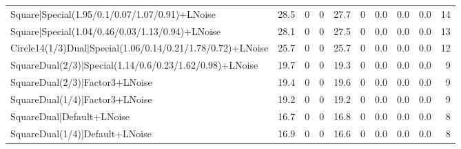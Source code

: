 \begin{tabular}{lrrrrrlllr}
 Square|Special(1.95/0.1/0.07/1.07/0.91)+LNoise                  &            28.5 &             0   &             0   &            27.7 &            0   & 0.0             & 0.0            & 0.0            &           14 \\
 Square|Special(1.04/0.46/0.03/1.13/0.94)+LNoise                 &            28.1 &             0   &             0   &            27.5 &            0   & 0.0             & 0.0            & 0.0            &           13 \\
 Circle14(1/3)Dual|Special(1.06/0.14/0.21/1.78/0.72)+LNoise      &            25.7 &             0   &             0   &            25.7 &            0   & 0.0             & 0.0            & 0.0            &           12 \\
 SquareDual(2/3)|Special(1.14/0.6/0.23/1.62/0.98)+LNoise         &            19.7 &             0   &             0   &            19.3 &            0   & 0.0             & 0.0            & 0.0            &            9 \\
 SquareDual(2/3)|Factor3+LNoise                                  &            19.4 &             0   &             0   &            19.6 &            0   & 0.0             & 0.0            & 0.0            &            9 \\
 SquareDual(1/4)|Factor3+LNoise                                  &            19.2 &             0   &             0   &            19.2 &            0   & 0.0             & 0.0            & 0.0            &            9 \\
 SquareDual|Default+LNoise                                       &            16.7 &             0   &             0   &            16.8 &            0   & 0.0             & 0.0            & 0.0            &            8 \\
 SquareDual(1/4)|Default+LNoise                                  &            16.9 &             0   &             0   &            16.6 &            0   & 0.0             & 0.0            & 0.0            &            8 \\
\hline
\end{tabular}